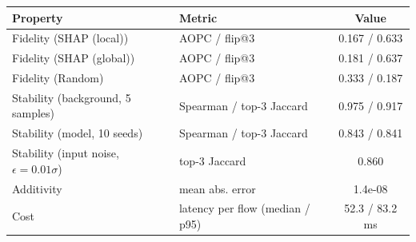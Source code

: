 \begin{tabular}{llc}
\toprule
\textbf{Property} & \textbf{Metric} & \textbf{Value} \\
\midrule
Fidelity (SHAP (local)) & AOPC / flip@3 & 0.167 / 0.633 \\
Fidelity (SHAP (global)) & AOPC / flip@3 & 0.181 / 0.637 \\
Fidelity (Random) & AOPC / flip@3 & 0.333 / 0.187 \\
Stability (background, 5 samples) & Spearman / top-3 Jaccard & 0.975 / 0.917 \\
Stability (model, 10 seeds) & Spearman / top-3 Jaccard & 0.843 / 0.841 \\
Stability (input noise, $\epsilon=0.01\sigma$) & top-3 Jaccard & 0.860 \\
Additivity & mean abs. error & 1.4e-08 \\
Cost & latency per flow (median / p95) & 52.3 / 83.2 ms \\
\bottomrule
\end{tabular}
